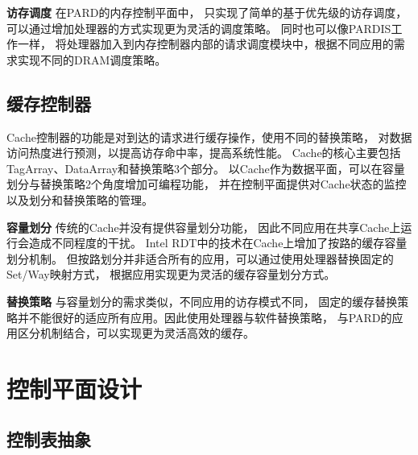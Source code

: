 \textbf{访存调度}\quad
在PARD的内存控制平面中，
只实现了简单的基于优先级的访存调度，可以通过增加处理器的方式实现更为灵活的调度策略。
同时也可以像PARDIS\cite{bojnordi_pardis:_2012}工作一样，
将处理器加入到内存控制器内部的请求调度模块中，根据不同应用的需求实现不同的DRAM调度策略。

\subsection{缓存控制器}
Cache控制器的功能是对到达的请求进行缓存操作，使用不同的替换策略，
对数据访问热度进行预测，以提高访存命中率，提高系统性能。
Cache的核心主要包括TagArray、DataArray和替换策略3个部分。
以Cache作为数据平面，可以在容量划分与替换策略2个角度增加可编程功能，
并在控制平面提供对Cache状态的监控以及划分和替换策略的管理。

\textbf{容量划分}\quad
传统的Cache并没有提供容量划分功能，
因此不同应用在共享Cache上运行会造成不同程度的干扰。
Intel RDT中的技术\cite{intel-cat}在Cache上增加了按路的缓存容量划分机制。
但按路划分并非适合所有的应用，可以通过使用处理器替换固定的Set/Way映射方式，
根据应用实现更为灵活的缓存容量划分方式。

\textbf{替换策略}\quad
与容量划分的需求类似，不同应用的访存模式不同，
固定的缓存替换策略并不能很好的适应所有应用。因此使用处理器与软件替换策略，
与PARD的应用区分机制结合，可以实现更为灵活高效的缓存。

\section{控制平面设计}
\label{chap:hwresman:cp}


%
%

\subsection{控制表抽象}
\label{chap:hwresman:cp:table}

